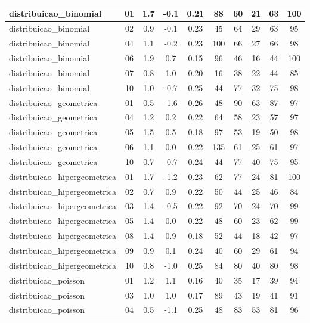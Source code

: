 \documentclass[a4paper]{report}
\begin{document}
\begin{longtable}{l|c|c|c|c|c|c|c|c|c}
\hline
distribuicao\_binomial & 01 & 1.7 & -0.1 & 0.21 & 88 & 60 & 21 & 63 & 100\\
\hline
distribuicao\_binomial & 02 & 0.9 & -0.1 & 0.23 & 45 & 64 & 29 & 63 & 95\\
\hline
distribuicao\_binomial & 04 & 1.1 & -0.2 & 0.23 & 100 & 66 & 27 & 66 & 98\\
\hline
distribuicao\_binomial & 06 & 1.9 & 0.7 & 0.15 & 96 & 46 & 16 & 44 & 100\\
\hline
distribuicao\_binomial & 07 & 0.8 & 1.0 & 0.20 & 16 & 38 & 22 & 44 & 85\\
\hline
distribuicao\_binomial & 10 & 1.0 & -0.7 & 0.25 & 44 & 77 & 32 & 75 & 98\\
\hline
distribuicao\_geometrica & 01 & 0.5 & -1.6 & 0.26 & 48 & 90 & 63 & 87 & 97\\
\hline
distribuicao\_geometrica & 04 & 1.2 & 0.2 & 0.22 & 64 & 58 & 23 & 57 & 97\\
\hline
distribuicao\_geometrica & 05 & 1.5 & 0.5 & 0.18 & 97 & 53 & 19 & 50 & 98\\
\hline
distribuicao\_geometrica & 06 & 1.1 & 0.0 & 0.22 & 135 & 61 & 25 & 61 & 97\\
\hline
distribuicao\_geometrica & 10 & 0.7 & -0.7 & 0.24 & 44 & 77 & 40 & 75 & 95\\
\hline
distribuicao\_hipergeometrica & 01 & 1.7 & -1.2 & 0.23 & 62 & 77 & 24 & 81 & 100\\
\hline
distribuicao\_hipergeometrica & 02 & 0.7 & 0.9 & 0.22 & 50 & 44 & 25 & 46 & 84\\
\hline
distribuicao\_hipergeometrica & 03 & 1.4 & -0.5 & 0.22 & 92 & 70 & 24 & 70 & 99\\
\hline
distribuicao\_hipergeometrica & 05 & 1.4 & 0.0 & 0.22 & 48 & 60 & 23 & 62 & 99\\
\hline
distribuicao\_hipergeometrica & 08 & 1.4 & 0.9 & 0.18 & 52 & 44 & 18 & 42 & 97\\
\hline
distribuicao\_hipergeometrica & 09 & 0.9 & 0.1 & 0.24 & 40 & 60 & 29 & 61 & 94\\
\hline
distribuicao\_hipergeometrica & 10 & 0.8 & -1.0 & 0.25 & 84 & 80 & 40 & 80 & 98\\
\hline
distribuicao\_poisson & 01 & 1.2 & 1.1 & 0.16 & 40 & 35 & 17 & 39 & 94\\
\hline
distribuicao\_poisson & 03 & 1.0 & 1.0 & 0.17 & 89 & 43 & 19 & 41 & 91\\
\hline
distribuicao\_poisson & 04 & 0.5 & -1.1 & 0.25 & 48 & 83 & 53 & 81 & 96\\

\end{longtable}
\end{document}

